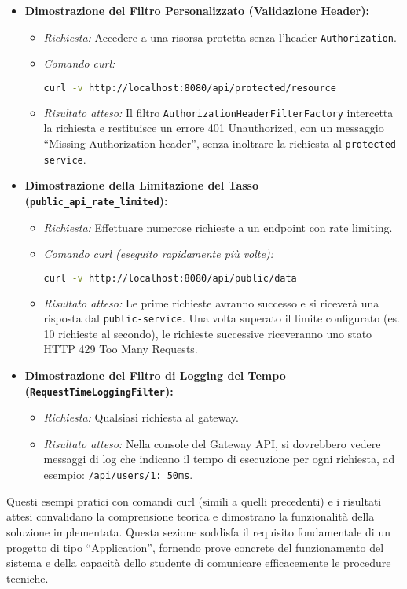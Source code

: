 \begin{itemize}
    \item \textbf{Dimostrazione del Filtro Personalizzato (Validazione Header):}
    \begin{itemize}
        \item \textit{Richiesta:} Accedere a una risorsa protetta senza l'header \texttt{Authorization}.
        \item \textit{Comando curl:}
        \begin{lstlisting}[language=bash]
curl -v http://localhost:8080/api/protected/resource \end{lstlisting}
        \item \textit{Risultato atteso:} Il filtro \texttt{AuthorizationHeaderFilterFactory} intercetta la richiesta e restituisce un errore 401 Unauthorized, con un messaggio \enquote{Missing Authorization header}, senza inoltrare la richiesta al \texttt{protected-service}.
    \end{itemize}

    \item \textbf{Dimostrazione della Limitazione del Tasso (\texttt{public\_api\_rate\_limited}):}
    \begin{itemize}
        \item \textit{Richiesta:} Effettuare numerose richieste a un endpoint con rate limiting.
        \item \textit{Comando curl (eseguito rapidamente più volte):}
        \begin{lstlisting}[language=bash]
curl -v http://localhost:8080/api/public/data \end{lstlisting}
        \item \textit{Risultato atteso:} Le prime richieste avranno successo e si riceverà una risposta dal \texttt{public-service}. Una volta superato il limite configurato (es. 10 richieste al secondo), le richieste successive riceveranno uno stato HTTP 429 Too Many Requests.
    \end{itemize}

    \item \textbf{Dimostrazione del Filtro di Logging del Tempo (\texttt{RequestTimeLoggingFilter}):}
    \begin{itemize}
        \item \textit{Richiesta:} Qualsiasi richiesta al gateway.
        \item \textit{Risultato atteso:} Nella console del Gateway API, si dovrebbero vedere messaggi di log che indicano il tempo di esecuzione per ogni richiesta, ad esempio: \texttt{/api/users/1: 50ms}.
    \end{itemize}
\end{itemize}
Questi esempi pratici con comandi curl (simili a quelli precedenti) e i risultati attesi convalidano la comprensione teorica e dimostrano la funzionalità della soluzione implementata. Questa sezione soddisfa il requisito fondamentale di un progetto di tipo \enquote{Application}, fornendo prove concrete del funzionamento del sistema e della capacità dello studente di comunicare efficacemente le procedure tecniche.